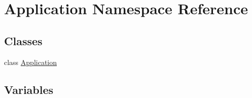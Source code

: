 \hypertarget{namespace_application}{}\section{Application Namespace Reference}
\label{namespace_application}
\subsection*{Classes}
\begin{DoxyCompactItemize}
\item 
class \hyperlink{class_application_1_1_application}{Application}
\end{DoxyCompactItemize}
\subsection*{Variables}
